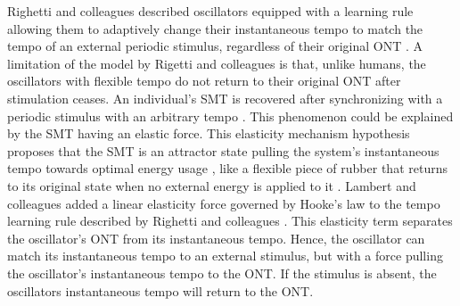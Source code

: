 \documentclass{report}
\begin{document}
Righetti and colleagues described oscillators equipped with a learning rule allowing them to adaptively change their instantaneous tempo to match the tempo of an external periodic stimulus, regardless of their original ONT \cite{righetti2009adaptive}. A limitation of the model by Rigetti and colleagues is that, unlike humans, the oscillators with flexible tempo do not return to their original ONT after stimulation ceases. An individual's SMT is recovered after synchronizing with a periodic stimulus with an arbitrary tempo \cite{scheurich2018tapping}. This phenomenon could be explained by the SMT having an elastic force. This elasticity mechanism hypothesis proposes that the SMT is an attractor state pulling the system's instantaneous tempo towards optimal energy usage \cite{mcauley2006time, scheurich2018tapping}, like a flexible piece of rubber that returns to its original state when no external energy is applied to it \cite{strogatz1993coupled}. Lambert and colleagues added a linear elasticity force governed by Hooke's law to the tempo learning rule described by Righetti and colleagues \cite{lambert2016adaptive}. This elasticity term separates the oscillator's ONT from its instantaneous tempo. Hence, the oscillator can match its instantaneous tempo to an external stimulus, but with a force pulling the oscillator's instantaneous tempo to the ONT. If the stimulus is absent, the oscillators instantaneous tempo will return to the ONT.
\end{document}
